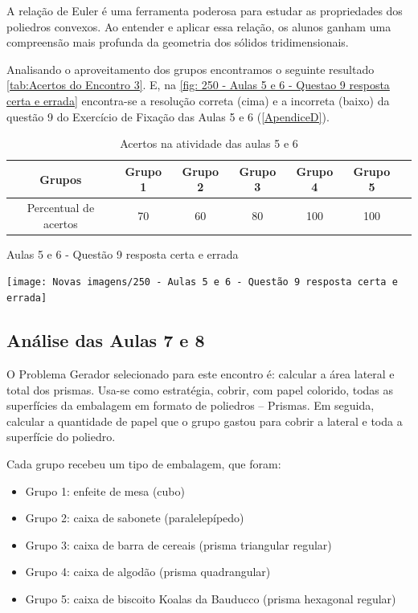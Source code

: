 A relação de Euler é uma ferramenta poderosa para estudar as propriedades dos poliedros convexos. Ao entender e aplicar essa relação, os alunos ganham uma compreensão mais profunda da geometria dos sólidos tridimensionais.

Analisando o aproveitamento dos grupos encontramos o seguinte resultado \autoref{tab:Acertos do Encontro 3}. E, na \autoref{fig: 250 - Aulas 5 e 6 - Questao 9 resposta certa e errada} encontra-se a resolução correta (cima) e a incorreta (baixo) da questão 9 do Exercício de Fixação das Aulas 5 e 6 (\autoref{ApendiceD}).

\begin{table}[htbp] \centering
    \caption{Acertos na atividade das aulas 5 e 6} \label{tab:Acertos do Encontro 3}
    \begin{tabular}{|c|c|c|c|c|c|c|}
        \hline
        \textbf{Grupos}       & \textbf{Grupo 1} & \textbf{Grupo 2} & \textbf{Grupo 3} & \textbf{Grupo 4} & \textbf{Grupo 5} \\
        \hline
        Percentual de acertos & 70               & 60               & 80               & 100              & 100              \\
        \hline
    \end{tabular}
    \legend{\legendaTabela}
\end{table}

\begin{CenteredFigure}
    \caption{Aulas 5 e 6 - Questão 9 resposta certa e errada} \label{fig: 250 - Aulas 5 e 6 - Questao 9 resposta certa e errada}
    \texttt{[image: Novas imagens/250 - Aulas 5 e 6 - Questão 9 resposta certa e errada]}
    \legend{\autoria}
\end{CenteredFigure}

\subsection{Análise das Aulas 7 e 8}

O Problema Gerador selecionado para este encontro é: calcular a área lateral e total dos prismas. Usa-se como estratégia, cobrir, com papel colorido, todas as superfícies da embalagem em formato de poliedros – Prismas. Em seguida, calcular a quantidade de papel que o grupo gastou para cobrir a lateral e toda a superfície do poliedro.

Cada grupo recebeu um tipo de embalagem, que foram:

\begin{itemize}
    \item Grupo 1: enfeite de mesa (cubo)
    \item Grupo 2: caixa de sabonete (paralelepípedo)
    \item Grupo 3: caixa de barra de cereais (prisma triangular regular)
    \item Grupo 4: caixa de algodão (prisma quadrangular)
    \item Grupo 5: caixa de biscoito Koalas da Bauducco (prisma hexagonal regular)
\end{itemize}

